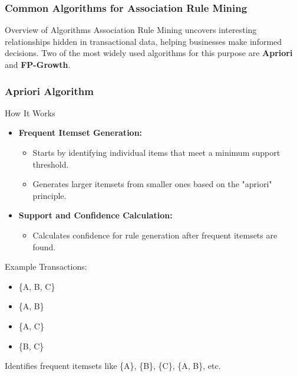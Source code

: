 \documentclass[aspectratio=169]{beamer}
\begin{document}
\begin{frame}[fragile]
    \frametitle{Common Algorithms for Association Rule Mining}
    \begin{block}{Overview of Algorithms}
        Association Rule Mining uncovers interesting relationships hidden in transactional data, helping businesses make informed decisions. 
        Two of the most widely used algorithms for this purpose are \textbf{Apriori} and \textbf{FP-Growth}.
    \end{block}
\end{frame}

\begin{frame}[fragile]
    \frametitle{Apriori Algorithm}
    
    \begin{block}{How It Works}
        \begin{itemize}
            \item \textbf{Frequent Itemset Generation:}
            \begin{itemize}
                \item Starts by identifying individual items that meet a minimum support threshold.
                \item Generates larger itemsets from smaller ones based on the "apriori" principle.
            \end{itemize}
            \item \textbf{Support and Confidence Calculation:}
            \begin{itemize}
                \item Calculates confidence for rule generation after frequent itemsets are found.
            \end{itemize}
        \end{itemize}
    \end{block}

    \begin{block}{Example}
        Transactions: 
        \begin{itemize}
            \item \{A, B, C\}
            \item \{A, B\}
            \item \{A, C\}
            \item \{B, C\}
        \end{itemize}
        Identifies frequent itemsets like \{A\}, \{B\}, \{C\}, \{A, B\}, etc.
    \end{block}


\end{frame}
\end{document}
